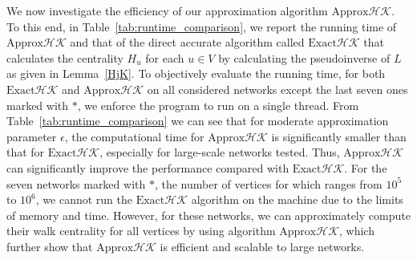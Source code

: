 \documentclass[sigconf]{acmart}
\newcommand\LL{\boldsymbol{\mathit{L}}}
\begin{document}
We now investigate the efficiency of our approximation algorithm $\text{Approx}\mathcal{HK}$. To this end, in Table~\ref{tab:runtime_comparison}, we report the running time of $\text{Approx}\mathcal{HK}$ and that of the direct accurate algorithm called $\text{Exact}\mathcal{HK}$ that calculates the centrality $H_u$ for each $u \in V$ by calculating the pseudoinverse of $\LL$ as given  in Lemma~\ref{HjK}. To objectively evaluate the running time, for both $\text{Exact}\mathcal{HK}$ and $\text{Approx}\mathcal{HK}$ on all considered networks except the last seven ones marked with $\ast$, we enforce the program to run on a single thread.  From Table~\ref{tab:runtime_comparison} we can see that for  moderate approximation parameter $\epsilon$, the computational time for $\text{Approx}\mathcal{HK}$ is significantly  smaller than  that  for $\text{Exact}\mathcal{HK}$, especially for large-scale networks tested.  Thus,   $\text{Approx}\mathcal{HK}$ can significantly improve the performance compared with  $\text{Exact}\mathcal{HK}$. For the  seven networks marked with $\ast$, the number of vertices for which ranges from $10^5$ to $10^6$, we cannot run the $\text{Exact}\mathcal{HK}$ algorithm on the machine due to the limits of memory and time. However, for these networks, we can approximately compute their walk centrality for all vertices by using algorithm $\text{Approx}\mathcal{HK}$, which further show that   $\text{Approx}\mathcal{HK}$ is  efficient and scalable to large networks.
\end{document}
